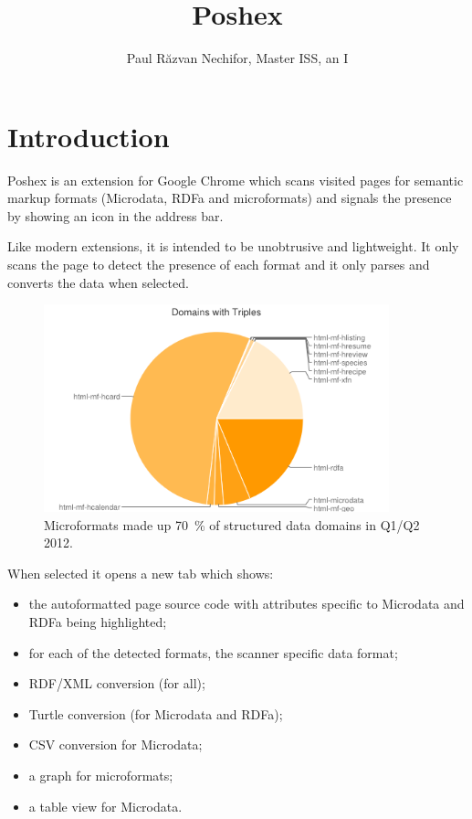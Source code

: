 \documentclass[12pt]{article}
\title{Poshex}
\author{Paul Răzvan Nechifor, Master ISS, an I}
\begin{document}
\maketitle

\tableofcontents
\pagebreak

\section*{Introduction}

Poshex is an extension for Google Chrome which scans visited pages for semantic
markup formats (Microdata, RDFa and microformats) and signals the presence by
showing an icon in the address bar.

Like modern extensions, it is intended to be unobtrusive and lightweight. It
only scans the page to detect the presence of each format and it only parses and
converts the data when selected.

\begin{figure}[b!]
    \centering
    \includegraphics[width=10cm]{uf-chart}
    \caption{Microformats made up 70~\% of structured data domains in Q1/Q2
    2012\cite{ufStat}.}
\end{figure}


When selected it opens a new tab which shows:
\begin{itemize}
    \item the autoformatted page source code with attributes specific to
    Microdata and RDFa being  highlighted;
    \item for each of the detected formats, the scanner specific data format;
    \item RDF/XML conversion (for all);
    \item Turtle conversion (for Microdata and RDFa);
    \item CSV conversion for Microdata;
    \item a graph for microformats;
    \item a table view for Microdata.
\end{itemize}
\end{document}
